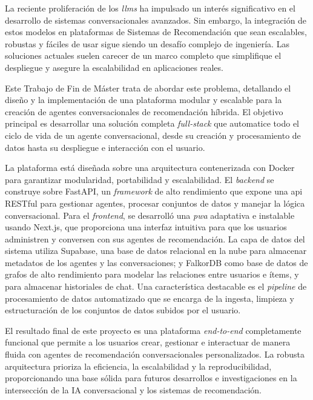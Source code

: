 La reciente proliferación de los \textit{\acp{llm}} ha impulsado un interés significativo en el desarrollo de sistemas conversacionales avanzados. Sin embargo, la integración de estos modelos en plataformas de Sistemas de Recomendación que sean escalables, robustas y fáciles de usar sigue siendo un desafío complejo de ingeniería. Las soluciones actuales suelen carecer de un marco completo que simplifique el despliegue y asegure la escalabilidad en aplicaciones reales.

Este Trabajo de Fin de Máster trata de abordar este problema, detallando el diseño y la implementación de una plataforma modular y escalable para la creación de agentes conversacionales de recomendación híbrida. El objetivo principal es desarrollar una solución completa \textit{full-stack} que automatice todo el ciclo de vida de un agente conversacional, desde su creación y procesamiento de datos hasta su despliegue e interacción con el usuario.

La plataforma está diseñada sobre una arquitectura contenerizada con Docker para garantizar modularidad, portabilidad y escalabilidad. El \textit{backend} se construye sobre FastAPI, un \textit{framework} de alto rendimiento que expone una \ac{api} RESTful para gestionar agentes, procesar conjuntos de datos y manejar la lógica conversacional. Para el \textit{frontend}, se desarrolló una \textit{\ac{pwa}} adaptativa e instalable usando Next.js, que proporciona una interfaz intuitiva para que los usuarios administren y conversen con sus agentes de recomendación. La capa de datos del sistema utiliza Supabase, una base de datos relacional en la nube para almacenar metadatos de los agentes y las conversaciones; y FalkorDB como base de datos de grafos de alto rendimiento para modelar las relaciones entre usuarios e ítems, y para almacenar historiales de chat. Una característica destacable es el \textit{pipeline} de procesamiento de datos automatizado que se encarga de la ingesta, limpieza y estructuración de los conjuntos de datos subidos por el usuario.

El resultado final de este proyecto es una plataforma \textit{end-to-end} completamente funcional que permite a los usuarios crear, gestionar e interactuar de manera fluida con agentes de recomendación conversacionales personalizados. La robusta arquitectura prioriza la eficiencia, la escalabilidad y la reproducibilidad, proporcionando una base sólida para futuros desarrollos e investigaciones en la intersección de la IA conversacional y los sistemas de recomendación.

